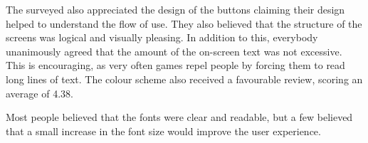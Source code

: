 The surveyed also appreciated the design of the buttons claiming their design helped to understand the flow of use.
They also believed that the structure of the screens was logical and visually pleasing. In addition to this, everybody unanimously agreed that the amount of the on-screen text was not excessive. This is encouraging, as very often games repel people by forcing them to read long lines of text. The colour scheme also received a favourable review, scoring an average of 4.38.

Most people believed that the fonts were clear and readable, but a few believed that a small increase in the font size would improve the user experience. 


